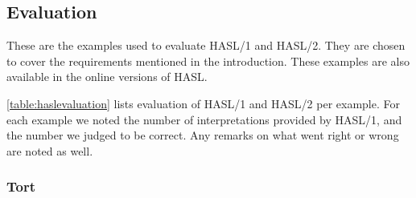 \subsection{Evaluation}
\label{sec:appevaluation}
These are the examples used to evaluate HASL/1 and HASL/2. They are chosen to cover the requirements mentioned in the introduction. These examples are also available in the online versions of HASL.

\autoref{table:haslevaluation} lists evaluation of HASL/1 and HASL/2 per example. For each example we noted the number of interpretations provided by HASL/1, and the number we judged to be correct. Any remarks on what went right or wrong are noted as well.

\subsubsection{Tort}
